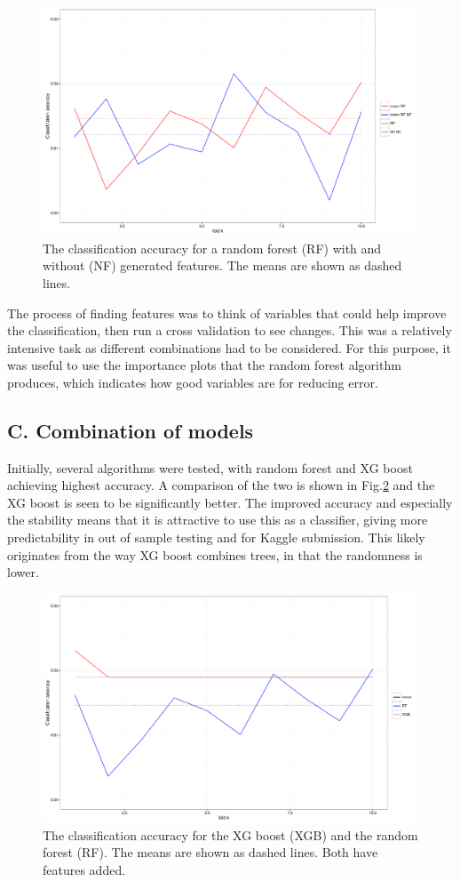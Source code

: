 \documentclass[onecolumn,prl,aps,10pt]{revtex4}
\begin{document}
\begin{figure}
\includegraphics*[height=0.4\linewidth , width=0.8\linewidth,clip]{rfrfnf.pdf}
\caption{The classification accuracy for a random forest (RF) with and without (NF) generated features. The means are shown as dashed lines.} \label{featgraph}
\end{figure}

The process of finding features was to think of variables that could help improve the classification, then run a cross validation to see changes. This was a relatively intensive task as different combinations had to be considered. For this purpose, it was useful to use the importance plots that the random forest algorithm produces, which indicates how good variables are for reducing error.

\subsection{C. Combination of models}
Initially, several algorithms were tested, with random forest and XG boost achieving highest accuracy. A comparison of the two is shown in Fig.\ref{xgrf} and the XG boost is seen to be significantly better. The improved accuracy and especially the stability means that it is attractive to use this as a classifier, giving more predictability in out of sample testing and for Kaggle submission. This likely originates from the way XG boost combines trees, in that the randomness is lower.

\begin{figure}
\includegraphics*[height=0.4\linewidth , width=0.8\linewidth,clip]{rfxgb.pdf}
\caption{The classification accuracy for the XG boost (XGB) and the random forest (RF). The means are shown as dashed lines. Both have features added.} \label{xgrf}
\end{figure}
\end{document}
